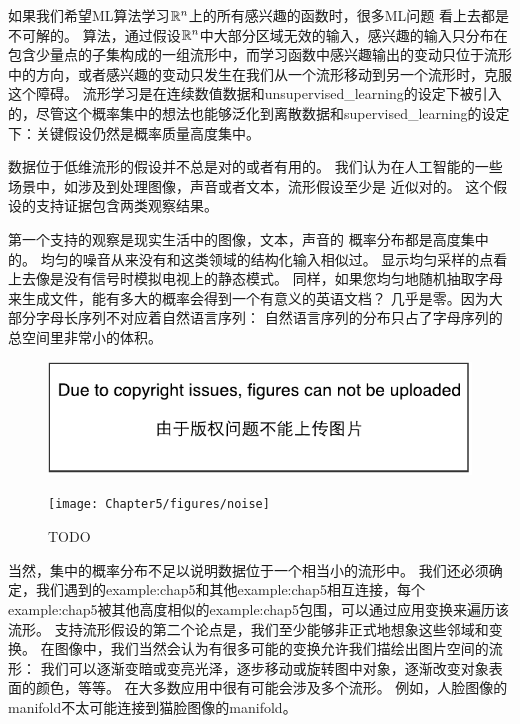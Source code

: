 如果我们希望\gls{ML}算法学习$\mathbb{R}^n$上的所有感兴趣的函数时，很多\gls{ML}问题
看上去都是不可解的。
算法，通过假设$\mathbb{R}^n$中大部分区域无效的输入，感兴趣的输入只分布在包含少量点的子集构成的一组流形中，而学习函数中感兴趣输出的变动只位于流形中的方向，或者感兴趣的变动只发生在我们从一个流形移动到另一个流形时，克服这个障碍。
流形学习是在连续数值数据和\gls{unsupervised_learning}的设定下被引入的，尽管这个概率集中的想法也能够泛化到离散数据和\gls{supervised_learning}的设定下：关键假设仍然是概率质量高度集中。


数据位于低维流形的假设并不总是对的或者有用的。
我们认为在人工智能的一些场景中，如涉及到处理图像，声音或者文本，流形假设至少是
近似对的。
这个假设的支持证据包含两类观察结果。

第一个支持的观察是现实生活中的图像，文本，声音的
概率分布都是高度集中的。
均匀的噪音从来没有和这类领域的结构化输入相似过。
显示均匀采样的点看上去像是没有信号时模拟电视上的静态模式。
同样，如果您均匀地随机抽取字母来生成文件，能有多大的概率会得到一个有意义的英语文档？
几乎是零。因为大部分字母长序列不对应着自然语言序列：
自然语言序列的分布只占了字母序列的总空间里非常小的体积。

\begin{figure}[!htb]
\ifOpenSource
\centerline{\includegraphics{figure.pdf}}
\else
\centerline{\texttt{[image: Chapter5/figures/noise]}}
\fi
\caption{TODO}
\label{fig:chap5_noise}
\end{figure}

当然，集中的概率分布不足以说明数据位于一个相当小的流形中。
我们还必须确定，我们遇到的\gls{example:chap5}和其他\gls{example:chap5}相互连接，每个\gls{example:chap5}被其他高度相似的\gls{example:chap5}包围，可以通过应用变换来遍历该流形。
支持流形假设的第二个论点是，我们至少能够非正式地想象这些邻域和变换。
在图像中，我们当然会认为有很多可能的变换允许我们描绘出图片空间的流形：
我们可以逐渐变暗或变亮光泽，逐步移动或旋转图中对象，逐渐改变对象表面的颜色，等等。
在大多数应用中很有可能会涉及多个流形。
例如，人脸图像的\gls{manifold}不太可能连接到猫脸图像的\gls{manifold}。

